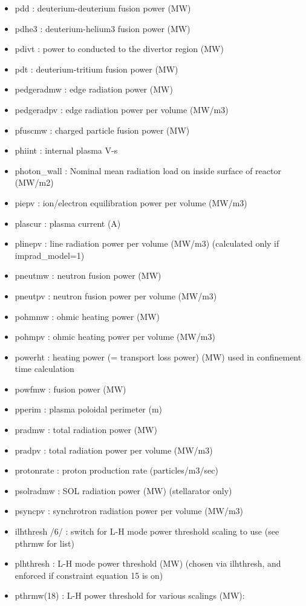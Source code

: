 \documentclass[
]{article}
\begin{document}
\begin{itemize}
\item
  pdd : deuterium-deuterium fusion power (MW)
\item
  pdhe3 : deuterium-helium3 fusion power (MW)
\item
  pdivt : power to conducted to the divertor region (MW)
\item
  pdt : deuterium-tritium fusion power (MW)
\item
  pedgeradmw : edge radiation power (MW)
\item
  pedgeradpv : edge radiation power per volume (MW/m3)
\item
  pfuscmw : charged particle fusion power (MW)
\item
  phiint : internal plasma V-s
\item
  photon\_wall : Nominal mean radiation load on inside surface of
  reactor (MW/m2)
\item
  piepv : ion/electron equilibration power per volume (MW/m3)
\item
  plascur : plasma current (A)
\item
  plinepv : line radiation power per volume (MW/m3) (calculated only if
  imprad\_model=1)
\item
  pneutmw : neutron fusion power (MW)
\item
  pneutpv : neutron fusion power per volume (MW/m3)
\item
  pohmmw : ohmic heating power (MW)
\item
  pohmpv : ohmic heating power per volume (MW/m3)
\item
  powerht : heating power (= transport loss power) (MW) used in
  confinement time calculation
\item
  powfmw : fusion power (MW)
\item
  pperim : plasma poloidal perimeter (m)
\item
  pradmw : total radiation power (MW)
\item
  pradpv : total radiation power per volume (MW/m3)
\item
  protonrate : proton production rate (particles/m3/sec)
\item
  psolradmw : SOL radiation power (MW) (stellarator only)
\item
  psyncpv : synchrotron radiation power per volume (MW/m3)
\item
  ilhthresh /6/ : switch for L-H mode power threshold scaling to use
  (see pthrmw for list)
\item
  plhthresh : L-H mode power threshold (MW) (chosen via ilhthresh, and
  enforced if constraint equation 15 is on)
\item
  pthrmw(18) : L-H power threshold for various scalings (MW):


\end{itemize}
\end{document}
